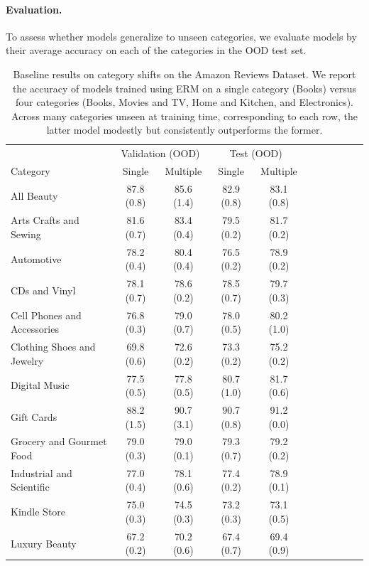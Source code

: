 \paragraph{Evaluation.}
To assess whether models generalize to unseen categories, we evaluate models by their average accuracy on each of the categories in the OOD test set.


\begin{table}[tbp]
  \caption{Baseline results on category shifts on the Amazon Reviews Dataset. We report the accuracy of models trained using ERM on a single category (Books) versus four categories (Books, Movies and TV, Home and Kitchen, and Electronics). Across many categories unseen at training time, corresponding to each row, the latter model modestly but consistently outperforms the former.}\label{tab:results_amazon_category}
  \centering
  \begin{small}
  \begin{tabular}{lcccccccccc}
  \toprule
  & \multicolumn{2}{c}{Validation (OOD)} & \multicolumn{2}{c}{Test (OOD)} \\
    Category & Single & Multiple & Single & Multiple \\
  \midrule
  All Beauty & 87.8 (0.8) & 85.6 (1.4) & 82.9 (0.8) & 83.1 (0.8) \\
  Arts Crafts and Sewing & 81.6 (0.7) & 83.4 (0.4) & 79.5 (0.2) & 81.7 (0.2) \\
  Automotive & 78.2 (0.4) & 80.4 (0.4) & 76.5 (0.2) & 78.9 (0.2) \\
  CDs and Vinyl & 78.1 (0.7) & 78.6 (0.2) & 78.5 (0.7) & 79.7 (0.3) \\
  Cell Phones and Accessories & 76.8 (0.3) & 79.0 (0.7) & 78.0 (0.5) & 80.2 (1.0) \\
  Clothing Shoes and Jewelry & 69.8 (0.6) & 72.6 (0.2) & 73.3 (0.2) & 75.2 (0.2) \\
  Digital Music & 77.5 (0.5) & 77.8 (0.5) & 80.7 (1.0) & 81.7 (0.6) \\
  Gift Cards & 88.2 (1.5) & 90.7 (3.1) & 90.7 (0.8) & 91.2 (0.0) \\
  Grocery and Gourmet Food & 79.0 (0.3) & 79.0 (0.1) & 79.3 (0.7) & 79.2 (0.2) \\
  Industrial and Scientific & 77.0 (0.4) & 78.1 (0.6) & 77.4 (0.2) & 78.9 (0.1) \\
  Kindle Store & 75.0 (0.3) & 74.5 (0.3) & 73.2 (0.3) & 73.1 (0.5) \\
  Luxury Beauty & 67.2 (0.2) & 70.2 (0.6) & 67.4 (0.7) & 69.4 (0.9) \\

\end{tabular}
\end{small}
\end{table}
